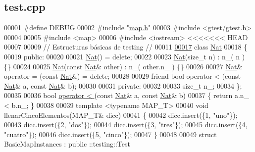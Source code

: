 \hypertarget{test_8cpp_source}{\subsection{test.\-cpp}
}

\begin{DoxyCode}
00001 \textcolor{preprocessor}{#define DEBUG}
00002 \textcolor{preprocessor}{}\textcolor{preprocessor}{#include "\hyperlink{map_8h}{map.h}"}
00003 \textcolor{preprocessor}{#include <gtest/gtest.h>}
00004 
00005 \textcolor{preprocessor}{#include <map>}
00006 \textcolor{preprocessor}{#include <iostream>}
<<<<<<< HEAD
00007 
00009 \textcolor{comment}{// Estructuras básicas de testing //}
00011 \textcolor{comment}{}
\hypertarget{test_8cpp_source_l00017}{}\hyperlink{classNat}{00017} \textcolor{keyword}{class }\hyperlink{classNat}{Nat}
00018 \{
00019     \textcolor{keyword}{public}:
00020 
00021         \hyperlink{classNat}{Nat}() = \textcolor{keyword}{delete};
00022 
00023         \hyperlink{classNat}{Nat}(\textcolor{keywordtype}{size\_t} n) : n\_( n ) \{\}
00024 
00025         \hyperlink{classNat}{Nat}(\textcolor{keyword}{const} \hyperlink{classNat}{Nat}& other) : n\_( other.n\_ ) \{\}
00026 
00027         \hyperlink{classNat}{Nat}& operator = (\textcolor{keyword}{const} \hyperlink{classNat}{Nat}&) = \textcolor{keyword}{delete};
00028 
00029         \textcolor{keyword}{friend} \textcolor{keywordtype}{bool} operator < (\textcolor{keyword}{const} \hyperlink{classNat}{Nat}& a, \textcolor{keyword}{const} \hyperlink{classNat}{Nat}& b);
00030 
00031     \textcolor{keyword}{private}:
00032 
00033         \textcolor{keywordtype}{size\_t} n\_;
00034 \};
00035 
00036 \textcolor{keywordtype}{bool} \hyperlink{classaed2_1_1map_a8ff07f6a24c290ea7e8f63ec7ab24f8d_a8ff07f6a24c290ea7e8f63ec7ab24f8d}{operator < }(\textcolor{keyword}{const} \hyperlink{classNat}{Nat}& a, \textcolor{keyword}{const} \hyperlink{classNat}{Nat}& b)
00037 \{ \textcolor{keywordflow}{return} a.n\_ < b.n\_; \}
00038 
00039 \textcolor{keyword}{template} <\textcolor{keyword}{typename} MAP\_T>
00040 \textcolor{keywordtype}{void} llenarCincoElementos(MAP\_T& dicc)
00041 \{
00042     dicc.insert(\{1, \textcolor{stringliteral}{"uno"}\});
00043     dicc.insert(\{2, \textcolor{stringliteral}{"dos"}\});
00044     dicc.insert(\{3, \textcolor{stringliteral}{"tres"}\});
00045     dicc.insert(\{4, \textcolor{stringliteral}{"cuatro"}\});
00046     dicc.insert(\{5, \textcolor{stringliteral}{"cinco"}\});
00047 \}
00048 
00049 \textcolor{keyword}{struct }BasicMapInstances : \textcolor{keyword}{public} ::testing::Test

\end{DoxyCode}
